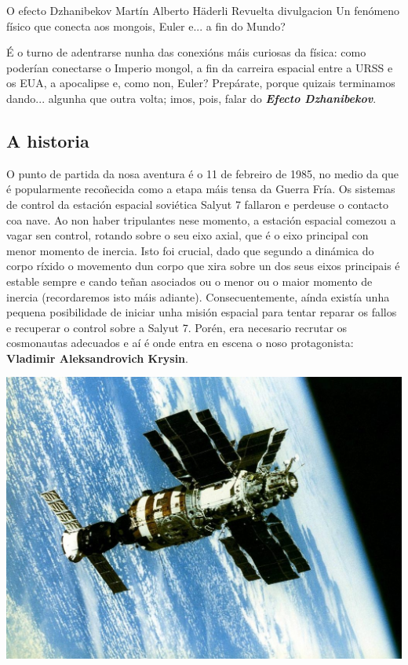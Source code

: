 \Titular%
{O efecto Dzhanibekov}%
{Martín Alberto Häderli Revuelta}%
{divulgacion}%
{Un fenómeno físico que conecta aos mongois, Euler e... a fin do Mundo?}%

\begin{refsection}
\begin{multicols}{2}


É o turno de adentrarse nunha das conexións máis curiosas da física: como
poderían conectarse o Imperio mongol, a fin da carreira espacial entre a URSS e
os EUA, a apocalipse e, como non, Euler? Prepárate, porque quizais terminamos
dando... algunha que outra volta; imos, pois, falar do \textit{\textbf{Efecto
Dzhanibekov}}.

\subsection*{A historia}

O punto de partida da nosa aventura é o 11 de febreiro de 1985, no medio da que
é popularmente recoñecida como a etapa máis tensa da Guerra Fría. Os sistemas
de control da estación espacial soviética Salyut 7 fallaron e perdeuse o
contacto coa nave. Ao non haber tripulantes nese momento, a estación espacial
comezou a vagar sen control, rotando sobre o seu eixo axial, que é o eixo
principal con menor momento de inercia. Isto foi crucial, dado que segundo a
dinámica do corpo ríxido o movemento dun corpo que xira sobre un dos seus eixos
principais é estable sempre e cando teñan asociados ou o menor ou o maior
momento de inercia (recordaremos isto máis adiante). Consecuentemente, aínda
existía unha pequena posibilidade de iniciar unha misión espacial para tentar
reparar os fallos e recuperar o control sobre a Salyut 7. Porén, era necesario
recrutar os cosmonautas adecuados e aí é onde entra en escena o noso
protagonista: \textbf{Vladimir Aleksandrovich Krysin}.\\

\begin{centering}
    \includegraphics[width=0.8\linewidth]{revistas/002/imaxes/img1.jpg}
    \label{fig:salyut}
\end{centering}\vspace{10pt}


\end{multicols}
\end{refsection}
